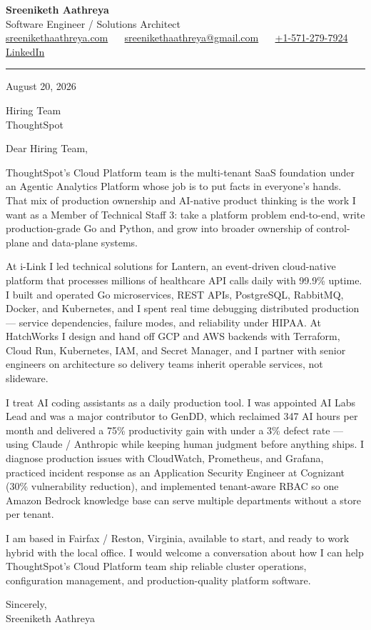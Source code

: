 \documentclass[11pt, letterpaper]{article}
\begin{document}
{\fontsize{18 pt}{20 pt}\selectfont\bfseries Sreeniketh Aathreya}\\[4pt]
Software Engineer / Solutions Architect\\[6pt]
\href{https://sreenikethaathreya.com}{sreenikethaathreya.com}
~\textbullet~
\href{mailto:sreenikethaathreya@gmail.com}{sreenikethaathreya@gmail.com}
~\textbullet~
\href{tel:+1-571-279-7924}{+1-571-279-7924}
~\textbullet~
\href{https://www.linkedin.com/in/sreeniketh-aathreya-16800b122/}{LinkedIn}

\vspace{12pt}
\hrule
\vspace{12pt}

August 20, 2026

\vspace{8pt}

Hiring Team\\
ThoughtSpot

\vspace{12pt}

Dear Hiring Team,

ThoughtSpot's Cloud Platform team is the multi-tenant SaaS foundation under an Agentic Analytics Platform whose job is to put facts in everyone's hands. That mix of production ownership and AI-native product thinking is the work I want as a Member of Technical Staff 3: take a platform problem end-to-end, write production-grade Go and Python, and grow into broader ownership of control-plane and data-plane systems.

At i-Link I led technical solutions for Lantern, an event-driven cloud-native platform that processes millions of healthcare API calls daily with 99.9\% uptime. I built and operated Go microservices, REST APIs, PostgreSQL, RabbitMQ, Docker, and Kubernetes, and I spent real time debugging distributed production --- service dependencies, failure modes, and reliability under HIPAA. At HatchWorks I design and hand off GCP and AWS backends with Terraform, Cloud Run, Kubernetes, IAM, and Secret Manager, and I partner with senior engineers on architecture so delivery teams inherit operable services, not slideware.

I treat AI coding assistants as a daily production tool. I was appointed AI Labs Lead and was a major contributor to GenDD, which reclaimed 347 AI hours per month and delivered a 75\% productivity gain with under a 3\% defect rate --- using Claude / Anthropic while keeping human judgment before anything ships. I diagnose production issues with CloudWatch, Prometheus, and Grafana, practiced incident response as an Application Security Engineer at Cognizant (30\% vulnerability reduction), and implemented tenant-aware RBAC so one Amazon Bedrock knowledge base can serve multiple departments without a store per tenant.

I am based in Fairfax / Reston, Virginia, available to start, and ready to work hybrid with the local office. I would welcome a conversation about how I can help ThoughtSpot's Cloud Platform team ship reliable cluster operations, configuration management, and production-quality platform software.

Sincerely,\\[12pt]
Sreeniketh Aathreya
\end{document}
